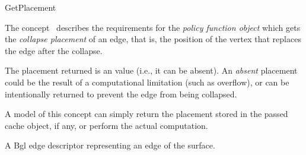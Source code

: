
\begin{ccRefConcept}{GetPlacement}


\ccDefinition

The concept \ccRefName\ describes the requirements for the {\em policy
function object} which gets the {\em collapse placement} of an edge,
that is, the position of the vertex that replaces the edge after the
collapse.

The placement returned is an  value (i.e., it can
be absent). An {\em absent} placement could be the result of a
computational limitation (such as overflow), or can be intentionally
returned to prevent the edge from being collapsed.

A model of this concept can simply return the placement stored in the
passed cache object, if any, or perform the actual computation.

\ccRefines
{}

\ccTypes
\ccGlue    
\ccGlue    
\ccGlue    
  {A {\sc Bgl} edge descriptor representing an edge of the surface.}
\ccGlue    

\ccCreation
{}  %


\end{ccRefConcept}
